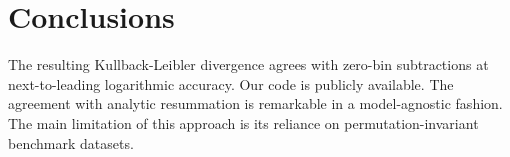 \section{Conclusions}\label{sec:conclusions}

The resulting Kullback-Leibler divergence agrees with zero-bin
subtractions at next-to-leading logarithmic accuracy. Our code is
publicly available. The agreement with analytic resummation is
remarkable in a model-agnostic fashion. The main limitation of this
approach is its reliance on permutation-invariant benchmark datasets.

